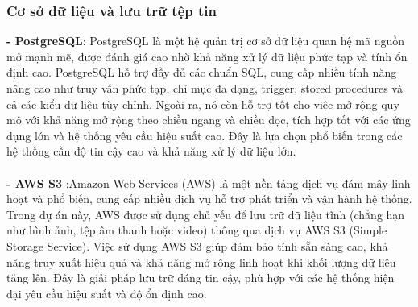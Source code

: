 \documentclass[a4paper,12pt]{article}
\begin{document}
\subsubsection{Cơ sở dữ liệu và lưu trữ tệp tin}
\textbf{- PostgreSQL}: PostgreSQL là một hệ quản trị cơ sở dữ liệu quan hệ mã nguồn mở mạnh mẽ, được đánh giá cao nhờ khả năng xử lý dữ liệu phức tạp và tính ổn định cao. PostgreSQL hỗ trợ đầy đủ các chuẩn SQL, cung cấp nhiều tính năng nâng cao như truy vấn phức tạp, chỉ mục đa dạng, trigger, stored procedures và cả các kiểu dữ liệu tùy chỉnh. Ngoài ra, nó còn hỗ trợ tốt cho việc mở rộng quy mô với khả năng mở rộng theo chiều ngang và chiều dọc, tích hợp tốt với các ứng dụng lớn và hệ thống yêu cầu hiệu suất cao. Đây là lựa chọn phổ biến trong các hệ thống cần độ tin cậy cao và khả năng xử lý dữ liệu lớn.   \\ \\
\textbf{- AWS S3} :Amazon Web Services (AWS) là một nền tảng dịch vụ đám mây linh hoạt và phổ biến, cung cấp nhiều dịch vụ hỗ trợ phát triển và vận hành hệ thống. Trong dự án này, AWS được sử dụng chủ yếu để lưu trữ dữ liệu tĩnh (chẳng hạn như hình ảnh, tệp âm thanh hoặc video) thông qua dịch vụ AWS S3 (Simple Storage Service). Việc sử dụng AWS S3 giúp đảm bảo tính sẵn sàng cao, khả năng truy xuất hiệu quả và khả năng mở rộng linh hoạt khi khối lượng dữ liệu tăng lên. Đây là giải pháp lưu trữ đáng tin cậy, phù hợp với các hệ thống hiện đại yêu cầu hiệu suất và độ ổn định cao.
  \\ 
\end{document}
